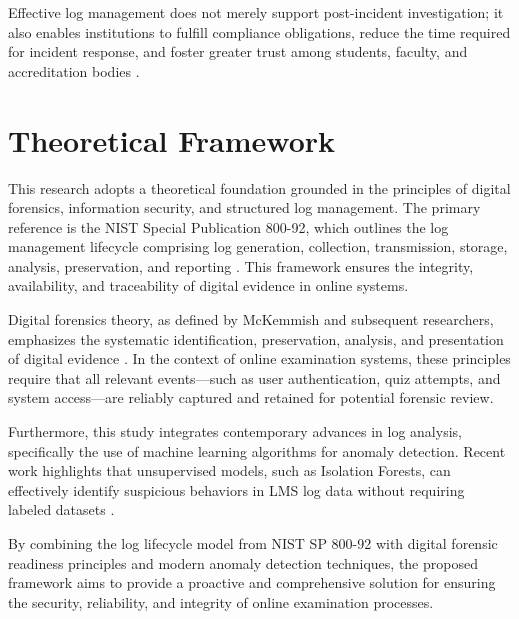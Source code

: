 Effective log management does not merely support post-incident investigation; it also enables institutions to fulfill compliance obligations, reduce the time required for incident response, and foster greater trust among students, faculty, and accreditation bodies \cite{rivera2019towards, abd2024enhancing}.
\section{Theoretical Framework}

This research adopts a theoretical foundation grounded in the principles of digital forensics, information security, and structured log management. The primary reference is the NIST Special Publication 800-92, which outlines the log management lifecycle comprising log generation, collection, transmission, storage, analysis, preservation, and reporting \cite{kentnist800922006guide}. This framework ensures the integrity, availability, and traceability of digital evidence in online systems.

Digital forensics theory, as defined by McKemmish and subsequent researchers, emphasizes the systematic identification, preservation, analysis, and presentation of digital evidence \cite{mckemmish1999}. In the context of online examination systems, these principles require that all relevant events—such as user authentication, quiz attempts, and system access—are reliably captured and retained for potential forensic review.

Furthermore, this study integrates contemporary advances in log analysis, specifically the use of machine learning algorithms for anomaly detection. Recent work highlights that unsupervised models, such as Isolation Forests, can effectively identify suspicious behaviors in LMS log data without requiring labeled datasets \cite{garg2023preserving, lintang2024log}.

By combining the log lifecycle model from NIST SP 800-92 with digital forensic readiness principles and modern anomaly detection techniques, the proposed framework aims to provide a proactive and comprehensive solution for ensuring the security, reliability, and integrity of online examination processes.

%

